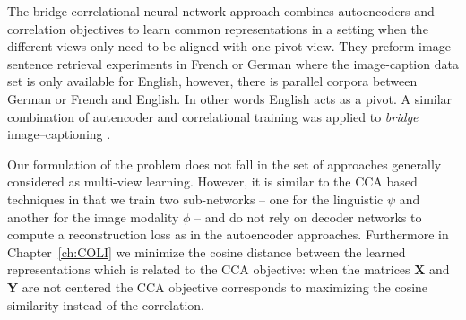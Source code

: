 The bridge correlational neural network approach \citep{rajendran2015bridge}
combines autoencoders and correlation objectives to 
learn common representations in a setting when the different views only need to be
aligned with one pivot view. They preform
image-sentence retrieval experiments in French or German where
the image-caption data set is only available for English, however,
there is parallel corpora between German or French and English. In other words English acts as a pivot.
A similar combination of autencoder and correlational training was applied to \emph{bridge}
image--captioning \citep{saha2016correlational}.

Our formulation of the problem does not fall in the set of approaches generally 
considered as multi-view learning.  However, it is similar to the CCA based techniques in that we
train two sub-networks -- one for the linguistic $\psi$ and another for the image modality $\phi$ --
and do not rely on decoder networks to compute a reconstruction  loss as in the autoencoder approaches.
Furthermore in Chapter~\ref{ch:COLI} we minimize the cosine distance between the learned representations
which is related to the CCA objective: when the matrices $\mathbf{X}$ and  $\mathbf{Y}$ are not centered
the CCA objective corresponds to maximizing the cosine similarity instead of the correlation.

